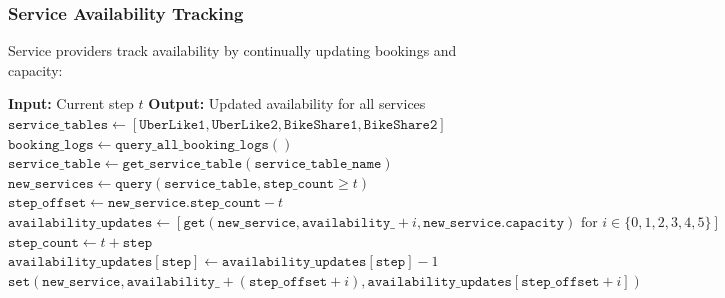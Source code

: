 \subsubsection{Service Availability Tracking}
Service providers track availability by continually updating bookings and capacity:

\begin{algorithm}
\caption{Update Service Availability}
\begin{algorithmic}[1]
\State \textbf{Input:} Current step $t$
\State \textbf{Output:} Updated availability for all services
\State $\texttt{service\_tables} \gets [\texttt{UberLike1}, \texttt{UberLike2}, \texttt{BikeShare1}, \texttt{BikeShare2}]$
\State $\texttt{booking\_logs} \gets \texttt{query\_all\_booking\_logs}()$
    \State $\texttt{service\_table} \gets \texttt{get\_service\_table}(\texttt{service\_table\_name})$
    \State $\texttt{new\_services} \gets \texttt{query}(\texttt{service\_table}, \texttt{step\_count} \geq t)$
        \State $\texttt{step\_offset} \gets \texttt{new\_service.step\_count} - t$
         
            \State $\texttt{availability\_updates} \gets [\texttt{get}(\texttt{new\_service}, \texttt{availability\_} + i, \texttt{new\_service.capacity}) \text{ for } i \in \{0, 1, 2, 3, 4, 5\}]$
                        \State $\texttt{step\_count} \gets t + \texttt{step}$
                            \State $\texttt{availability\_updates}[\texttt{step}] \gets \texttt{availability\_updates}[\texttt{step}] - 1$
                        \EndIf
                    \EndFor
                \EndIf
            \EndFor
                    \State $\texttt{set}(\texttt{new\_service}, \texttt{availability\_} + (\texttt{step\_offset} + i), \texttt{availability\_updates}[\texttt{step\_offset} + i])$
                \EndIf
            \EndFor
        \EndIf
    \EndFor
\EndFor
\end{algorithmic}
\end{algorithm}

